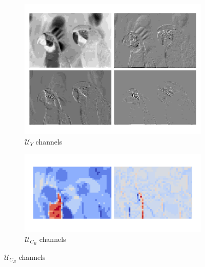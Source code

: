 \begin{figure}[t]
    \centering
    \begin{minipage}{0.40\textwidth}
        \begin{subfigure}{\textwidth}
            \centering
            \includegraphics[width=.95\textwidth]{figures/kodim23_Y_components.pdf}
            \vspace{-10pt}
            \caption{$\bm{\mathcal{U}}_Y$ channels}
        \end{subfigure}%
    \end{minipage}
    \hspace{0.1cm} 
    \begin{minipage}{0.35\textwidth}
        \centering
        \begin{minipage}{\textwidth}
            \begin{subfigure}{\textwidth}
                \centering
                \includegraphics[width=.95\textwidth]{figures/kodim23_cb_components.pdf}
                \vspace{-12pt}
                \caption{$\bm{\mathcal{U}}_{C_B}$ channels}
            \end{subfigure}%

\end{minipage}
\end{minipage}
\end{figure}
